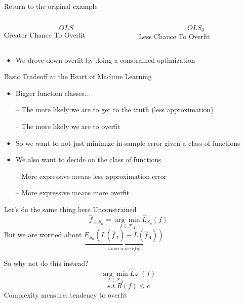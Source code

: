 \documentclass{beamer}
\begin{document}
\begin{frame}{Return to the original example}
	\begin{columns}
		\begin{column}[t]{0.5\textwidth}
			$$OLS$$
			\qquad Greater Chance To Overfit
		\end{column}
		
		\begin{column}[t]{0.5\textwidth}
			$$OLS_0$$
			\qquad Less Chance To Overfit
		\end{column}
	\end{columns}
	
	\begin{itemize}
	\vspace{2cm}
	\item We drove down overfit by doing a constrained optimization
	\end{itemize}
\end{frame}

\begin{frame}{Basic Tradeoff at the Heart of Machine Learning}
	\begin{itemize}
		\item Bigger function classes...
		
		– The more likely we are to get to the truth (less approximation)
		
		– The more likely we are to overfit
		
		\item So we want to not just minimize in-sample error given a class of functions
		
		\item We also want to decide on the class of functions 
		
		– More expressive means less approximation error
		
		– More expressive means more overfit
	\end{itemize}
\end{frame}

\begin{frame}{Let's do the same thing here}
		Unconstrained
		$$\hat{f}_{A,S_n}=\underset{f \in \mathcal{F}_A}{\arg\min}\hat{L}_{S_n}(f)$$
		But we are worried about $\underbrace{E_{S_n}(L(\hat{f}_A)-\hat{L}(\hat{f}_A))}_{\textit{unseen overfit}}$
		
		So why not do this instead?
		$$\underset{f \in \mathcal{F}_A}{\arg\min}\hat{L}_{S_n}(f)$$
		$$ s.t.  R(f)\leq c$$ Complexity measure: tendency to overfit
\end{frame}
\end{document}

